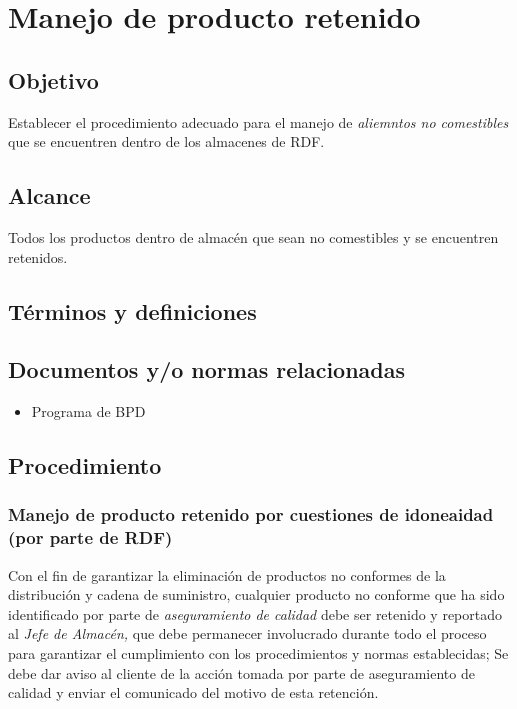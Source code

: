 \thispagestyle{formato-PI}
\renewcommand{\MayorVer}{2}
\renewcommand{\MenorVer}{0}
\renewcommand{\FechaPub}{2023--01}
\renewcommand{\TipoID}{PRO}
\renewcommand{\Titulo}{Manejo de producto retenido}
\section{\Titulo}
\renewcommand{\Codigo}{\Prog--\thesection--\TipoID}
\subsection{Objetivo}
Establecer el procedimiento adecuado para el manejo de \emph{aliemntos no comestibles} que se encuentren dentro de los almacenes de \gls{RDF}.

\subsection{Alcance}
Todos los productos dentro de almacén que sean no comestibles y se encuentren retenidos.

\subsection{Términos y definiciones}
\begin{description}
\end{description}

\subsection{Documentos y/o normas relacionadas}
\begin{itemize}
	\item Programa de \gls{BPD}
\end{itemize}

\subsection{Procedimiento}
\subsubsection{Manejo de producto retenido por cuestiones de idoneaidad (por parte de RDF)}
Con el fin de garantizar la eliminación de productos no conformes de la distribución y cadena de suministro, cualquier producto no conforme que ha sido identificado por parte de \emph{aseguramiento de calidad} debe ser retenido y reportado al \emph{Jefe de Almacén,} que debe permanecer involucrado durante todo el proceso para garantizar el cumplimiento con los procedimientos y normas establecidas; Se debe dar aviso al cliente de la acción tomada por parte de aseguramiento de calidad y enviar el comunicado del motivo de esta retención.

